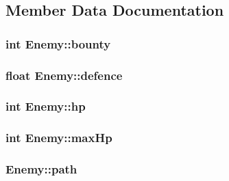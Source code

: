\subsection{Member Data Documentation}
\hypertarget{class_enemy_a1d9a86d110b87f3cc55b40d1bdb59eb5}{
\subsubsection[{bounty}]{\setlength{\rightskip}{0pt plus 5cm}int Enemy\+::bounty\hspace{0.3cm}{\ttfamily [protected]}}}\label{class_enemy_a1d9a86d110b87f3cc55b40d1bdb59eb5}
\hypertarget{class_enemy_a9bb5d74024760e604c41ba79cc7da892}{
\subsubsection[{defence}]{\setlength{\rightskip}{0pt plus 5cm}float Enemy\+::defence\hspace{0.3cm}{\ttfamily [protected]}}}\label{class_enemy_a9bb5d74024760e604c41ba79cc7da892}
\hypertarget{class_enemy_a278d70100af07c946743db1b7a1a9f59}{
\subsubsection[{hp}]{\setlength{\rightskip}{0pt plus 5cm}int Enemy\+::hp\hspace{0.3cm}{\ttfamily [protected]}}}\label{class_enemy_a278d70100af07c946743db1b7a1a9f59}
\hypertarget{class_enemy_ab48bc28310a5ca396fbfaf6edc74996d}{
\subsubsection[{max\+Hp}]{\setlength{\rightskip}{0pt plus 5cm}int Enemy\+::max\+Hp\hspace{0.3cm}{\ttfamily [protected]}}}\label{class_enemy_ab48bc28310a5ca396fbfaf6edc74996d}
\hypertarget{class_enemy_aff8dab38e3d179a2fb471cf7a9c42cbe}{
\subsubsection[{path}]{ Enemy\+::path\hspace{0.3cm}{\ttfamily [protected]}}}\label{class_enemy_aff8dab38e3d179a2fb471cf7a9c42cbe}
